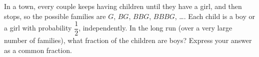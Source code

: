 In a town, every couple keeps having children until they have a girl, and then stops, so the possible families are $G$, $BG$, $BBG$, $BBBG$, \dots. Each child is a boy or a girl with probability $\dfrac{1}{2}$, independently. In the long run (over a very large number of families), what fraction of the children are boys? Express your answer as a common fraction.
